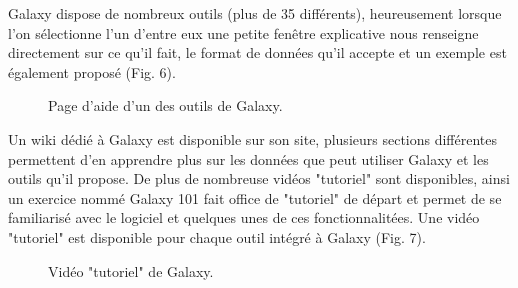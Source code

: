 Galaxy dispose de nombreux outils (plus de 35 différents), heureusement lorsque l'on sélectionne l'un d'entre eux une petite fenêtre explicative nous renseigne directement sur ce qu'il fait, le format de données qu'il accepte et un exemple est également proposé (Fig. 6).\\


\begin{figure}[!h]
 \centering
{}
\caption{Page d'aide d'un des outils de Galaxy.}
\end{figure}

Un wiki dédié à Galaxy est disponible sur son site, plusieurs sections différentes permettent d'en apprendre plus sur les données que peut utiliser Galaxy et les outils qu'il propose. De plus de nombreuse vidéos "tutoriel" sont disponibles, ainsi un exercice nommé Galaxy 101 fait office de "tutoriel" de départ et permet de se familiarisé avec le logiciel et quelques unes de ces fonctionnalitées. Une vidéo "tutoriel" est disponible pour chaque outil intégré à Galaxy (Fig. 7).

\begin{figure}[!h]
 \centering
{}
\caption{Vidéo "tutoriel" de Galaxy.}
\end{figure}

